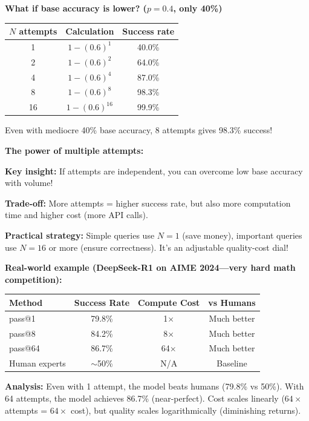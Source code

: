 \begin{chapterenv}
\textbf{What if base accuracy is lower? ($p = 0.4$, only 40\%)}

\begin{center}
\begin{tabular}{ccc}
\toprule
\textbf{$N$ attempts} & \textbf{Calculation} & \textbf{Success rate} \\
\midrule
1 & $1 - (0.6)^1$ & 40.0\% \\
2 & $1 - (0.6)^2$ & 64.0\% \\
4 & $1 - (0.6)^4$ & 87.0\% \\
8 & $1 - (0.6)^8$ & 98.3\% \\
16 & $1 - (0.6)^{16}$ & 99.9\% \\
\bottomrule
\end{tabular}
\end{center}

Even with mediocre 40\% base accuracy, 8 attempts gives 98.3\% success!

\begin{infobox}
\textbf{The power of multiple attempts:}

\textbf{Key insight:} If attempts are independent, you can overcome low base accuracy with volume!

\textbf{Trade-off:} More attempts = higher success rate, but also more computation time and higher cost (more API calls).

\textbf{Practical strategy:} Simple queries use $N=1$ (save money), important queries use $N=16$ or more (ensure correctness). It's an adjustable quality-cost dial!
\end{infobox}

\textbf{Real-world example (DeepSeek-R1 on AIME 2024---very hard math competition):}

\begin{center}
\begin{tabular}{lccc}
\toprule
\textbf{Method} & \textbf{Success Rate} & \textbf{Compute Cost} & \textbf{vs Humans} \\
\midrule
pass@1 & 79.8\% & 1$\times$ & Much better \\
pass@8 & 84.2\% & 8$\times$ & Much better \\
pass@64 & 86.7\% & 64$\times$ & Much better \\
\midrule
Human experts & $\sim$50\% & N/A & Baseline \\
\bottomrule
\end{tabular}
\end{center}

\textbf{Analysis:} Even with 1 attempt, the model beats humans (79.8\% vs 50\%). With 64 attempts, the model achieves 86.7\% (near-perfect). Cost scales linearly ($64\times$ attempts = $64\times$ cost), but quality scales logarithmically (diminishing returns).

\end{chapterenv}